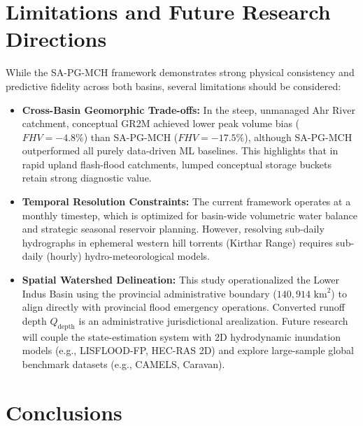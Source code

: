 \documentclass[11pt,a4paper,fleqn]{article}
\begin{document}

\section{Limitations and Future Research Directions}

While the SA-PG-MCH framework demonstrates strong physical consistency and predictive fidelity across both basins, several limitations should be considered:
\begin{itemize}
    \item \textbf{Cross-Basin Geomorphic Trade-offs:} In the steep, unmanaged Ahr River catchment, conceptual GR2M achieved lower peak volume bias ($FHV = -4.8\%$) than SA-PG-MCH ($FHV = -17.5\%$), although SA-PG-MCH outperformed all purely data-driven ML baselines. This highlights that in rapid upland flash-flood catchments, lumped conceptual storage buckets retain strong diagnostic value.
    \item \textbf{Temporal Resolution Constraints:} The current framework operates at a monthly timestep, which is optimized for basin-wide volumetric water balance and strategic seasonal reservoir planning. However, resolving sub-daily hydrographs in ephemeral western hill torrents (Kirthar Range) requires sub-daily (hourly) hydro-meteorological models.
    \item \textbf{Spatial Watershed Delineation:} This study operationalized the Lower Indus Basin using the provincial administrative boundary ($140,914\text{ km}^2$) to align directly with provincial flood emergency operations. Converted runoff depth $Q_{\text{depth}}$ is an administrative jurisdictional arealization. Future research will couple the state-estimation system with 2D hydrodynamic inundation models (e.g., LISFLOOD-FP, HEC-RAS 2D) and explore large-sample global benchmark datasets (e.g., CAMELS, Caravan).
\end{itemize}


\section{Conclusions}
\end{document}
